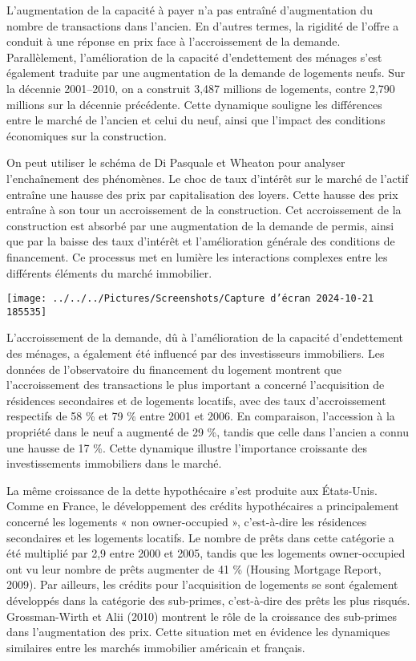 \documentclass[a4paper, 12pt]{report}
\begin{document}
L'augmentation de la capacité à payer n'a pas entraîné d'augmentation du nombre de transactions dans l'ancien. En d'autres termes, la rigidité de l'offre a conduit à une réponse en prix face à l'accroissement de la demande. Parallèlement, l'amélioration de la capacité d'endettement des ménages s'est également traduite par une augmentation de la demande de logements neufs. Sur la décennie 2001–2010, on a construit 3,487 millions de logements, contre 2,790 millions sur la décennie précédente. Cette dynamique souligne les différences entre le marché de l'ancien et celui du neuf, ainsi que l'impact des conditions économiques sur la construction.

On peut utiliser le schéma de Di Pasquale et Wheaton pour analyser l'enchaînement des phénomènes. Le choc de taux d'intérêt sur le marché de l'actif entraîne une hausse des prix par capitalisation des loyers. Cette hausse des prix entraîne à son tour un accroissement de la construction. Cet accroissement de la construction est absorbé par une augmentation de la demande de permis, ainsi que par la baisse des taux d'intérêt et l'amélioration générale des conditions de financement. Ce processus met en lumière les interactions complexes entre les différents éléments du marché immobilier.

\begin{center}
	\texttt{[image: ../../../Pictures/Screenshots/Capture d'écran 2024-10-21 185535]}
\end{center}

L'accroissement de la demande, dû à l'amélioration de la capacité d'endettement des ménages, a également été influencé par des investisseurs immobiliers. Les données de l'observatoire du financement du logement montrent que l'accroissement des transactions le plus important a concerné l'acquisition de résidences secondaires et de logements locatifs, avec des taux d'accroissement respectifs de 58 \% et 79 \% entre 2001 et 2006. En comparaison, l'accession à la propriété dans le neuf a augmenté de 29 \%, tandis que celle dans l'ancien a connu une hausse de 17 \%. Cette dynamique illustre l'importance croissante des investissements immobiliers dans le marché.

La même croissance de la dette hypothécaire s'est produite aux États-Unis. Comme en France, le développement des crédits hypothécaires a principalement concerné les logements « non owner-occupied », c'est-à-dire les résidences secondaires et les logements locatifs. Le nombre de prêts dans cette catégorie a été multiplié par 2,9 entre 2000 et 2005, tandis que les logements owner-occupied ont vu leur nombre de prêts augmenter de 41 \% (Housing Mortgage Report, 2009). Par ailleurs, les crédits pour l'acquisition de logements se sont également développés dans la catégorie des sub-primes, c'est-à-dire des prêts les plus risqués. Grossman-Wirth et Alii (2010) montrent le rôle de la croissance des sub-primes dans l'augmentation des prix. Cette situation met en évidence les dynamiques similaires entre les marchés immobilier américain et français.
\end{document}
